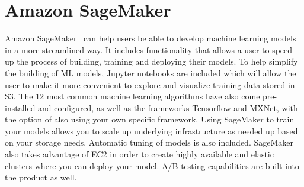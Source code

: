 \section{Amazon SageMaker}

Amazon SageMaker~\cite{hid-sp18-521-Sagemaker} can help users
be able to develop machine learning models in a more streamlined way. It
includes functionality that allows a user to speed up the process of
building, training and deploying their models. To help simplify the 
building of ML models, Jupyter notebooks are included which will allow 
the user to make it more convenient to explore and visualize training 
data stored in S3. The 12 most common machine learning algorithms have 
also come pre-installed and configured, as well as the frameworks Tensorflow
and MXNet, with the option of also using your own specific framework. 
Using SageMaker to train your models allows you to scale up underlying 
infrastructure as needed up based on your storage needs. Automatic tuning
of models is also included. SageMaker also takes advantage of EC2 in order
to create highly available and elastic clusters where you can deploy your
model. A/B testing capabilities are built into the product as well. 
